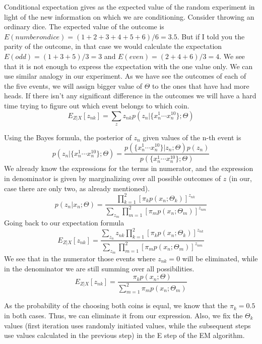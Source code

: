 \documentclass[11pt]{article}
\begin{document}
Conditional expectation gives as the expected value of the random experiment in light of the
new information on which we are conditioning. Consider throwing an ordinary dice. The expected value of the outcome is $E(number on dice)=(1+2+3+4+5+6)/6=3.5$. But if I told you the parity of the outcome, in that case we would calculate the expectation $E(odd)=(1+3+5)/3=3$ and $E(even)=(2+4+6)/3=4$. We see that it is not enough to express the expectation with the one value only. We can use similar analogy in our experiment. As we have see the outcomes of each of the five events, we will assign bigger value of $\Theta$ to the ones that have had more heads. If there isn't any significant difference in the outcomes we will have a hard time trying to figure out which event belongs to which coin.
\begin{equation}
  E_{Z|X}[z_{nk}]=
\sum_{z}z_{nk}p(z_n|\{x^1_n\cdots x^{10}_n\};\Theta)  
\end{equation}

Using the Bayes formula, the posterior of $z_n$ given values of the n-th event is
\begin{equation}
p(z_n|\{x^1_n\cdots x^{10}_n\};\Theta)=\frac{p(\{x^1_n\cdots x^{10}_n\}|z_n;\Theta)p(z_n)}{p(\{x^1_n\cdots x^{10}_n\};\Theta)}
\end{equation}
We already know the expressions for the terms in numerator, and the expression in denominator is given by marginalizing over all possible outcomes of $z$ (in our, case there are only two, as already mentioned). 
\begin{equation}
p(z_n|x_n;\Theta)=\frac{\prod_{k=1}^{2}[\pi_{k}p(x_n;\Theta_k)]^{z_{nk}}}{\sum_{z_m}\prod_{m=1}^{2}[\pi_{m}p(x_n;\Theta_m)]^{z_{nm}}}
\end{equation}
Going back to our expectation formula
\begin{equation}
E_{Z|X}[z_{nk}]=
\frac{\sum_{z_n}z_{nk}\prod_{k=1}^{2}[\pi_{k}p(x_n;\Theta_k)]^{z_{nk}}}{\sum_{z_m}\prod_{m=1}^{2}[\pi_{m}p(x_n;\Theta_m)]^{z_{nm}}}
\end{equation}
We see that in the numerator those events where $z_{nk}=0$ will be eliminated, while in the denominator we are still summing over all possibilities. 
\begin{equation}
E_{Z|X}[z_{nk}]=
\frac{\pi_{k}p(x_n;\Theta)}{\sum_{m=1}^{2}\pi_{m}p(x_n;\Theta_m)}
\end{equation}

As the probability of the choosing both coins is equal, we know that the $\pi_k=0.5$ in both cases. Thus, we can eliminate it from our expression. Also, we fix the $\Theta_k$ values (first iteration uses randomly initiated values, while the subsequent steps use values calculated in the previous step) in the E step of the EM algorithm. 
\end{document}
